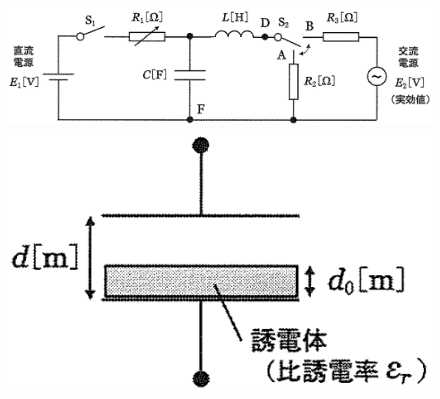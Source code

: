 \begin{figure}[htbp]
  \centering
  \begin{minipage}{.65\columnwidth}
    \centering
    \includegraphics[width=\columnwidth]{../graphs/yokokoku_23_2-1.png}
    \caption{}
  \end{minipage}
  \begin{minipage}{.2\columnwidth}
    \centering
    \includegraphics[width=\columnwidth]{../graphs/yokokoku_23_2-2.png}
    \caption{}
  \end{minipage}
\end{figure}

